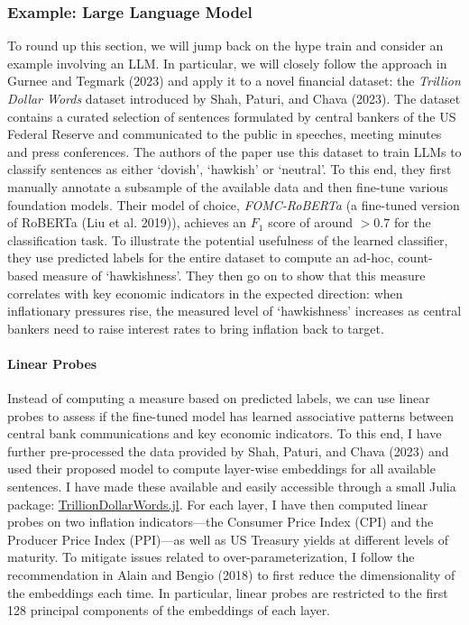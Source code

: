 \documentclass[
  letterpaper,
  DIV=11,
  numbers=noendperiod]{scrartcl}
\let\oldparagraph\paragraph
\renewcommand{\paragraph}[1]{\oldparagraph{#1}\mbox{}}
\theoremstyle{plain}
\theoremstyle{remark}
\begin{document}


\subsubsection{Example: Large Language Model}\label{ex-llm}

To round up this section, we will jump back on the hype train and
consider an example involving an LLM. In particular, we will closely
follow the approach in Gurnee and Tegmark (2023) and apply it to a novel
financial dataset: the \emph{Trillion Dollar Words} dataset introduced
by Shah, Paturi, and Chava (2023). The dataset contains a curated
selection of sentences formulated by central bankers of the US Federal
Reserve and communicated to the public in speeches, meeting minutes and
press conferences. The authors of the paper use this dataset to train
LLMs to classify sentences as either `dovish', `hawkish' or `neutral'.
To this end, they first manually annotate a subsample of the available
data and then fine-tune various foundation models. Their model of
choice, \emph{FOMC-RoBERTa} (a fine-tuned version of RoBERTa (Liu et al.
2019)), achieves an \(F_1\) score of around \(>0.7\) for the
classification task. To illustrate the potential usefulness of the
learned classifier, they use predicted labels for the entire dataset to
compute an ad-hoc, count-based measure of `hawkishness'. They then go on
to show that this measure correlates with key economic indicators in the
expected direction: when inflationary pressures rise, the measured level
of `hawkishness' increases as central bankers need to raise interest
rates to bring inflation back to target.

\paragraph{Linear Probes}\label{linear-probes}

Instead of computing a measure based on predicted labels, we can use
linear probes to assess if the fine-tuned model has learned associative
patterns between central bank communications and key economic
indicators. To this end, I have further pre-processed the data provided
by Shah, Paturi, and Chava (2023) and used their proposed model to
compute layer-wise embeddings for all available sentences. I have made
these available and easily accessible through a small Julia package:
\href{https://github.com/pat-alt/TrillionDollarWords.jl}{TrillionDollarWords.jl}.
For each layer, I have then computed linear probes on two inflation
indicators---the Consumer Price Index (CPI) and the Producer Price Index
(PPI)---as well as US Treasury yields at different levels of maturity.
To mitigate issues related to over-parameterization, I follow the
recommendation in Alain and Bengio (2018) to first reduce the
dimensionality of the embeddings each time. In particular, linear probes
are restricted to the first 128 principal components of the embeddings
of each layer.
\end{document}

